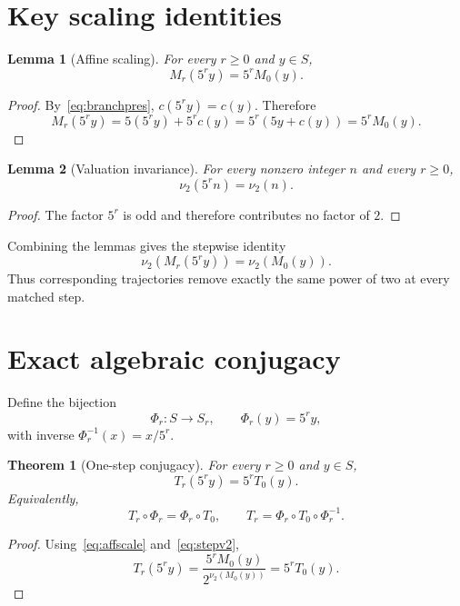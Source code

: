 \documentclass[11pt]{article}
\newtheorem{theorem}{Theorem}
\newtheorem{lemma}{Lemma}
\newcommand{\vTwo}{\nu_2}
\begin{document}
\section{Key scaling identities}
\begin{lemma}[Affine scaling]
For every $r\ge0$ and $y\in S$,
\begin{equation}
M_r(5^r y)=5^rM_0(y).
\label{eq:affscale}
\end{equation}
\end{lemma}
\begin{proof}
By~\eqref{eq:branchpres}, $c(5^r y)=c(y)$. Therefore
\[
M_r(5^r y)=5(5^r y)+5^r c(y)=5^r(5y+c(y))=5^rM_0(y).
\]
\end{proof}

\begin{lemma}[Valuation invariance]
For every nonzero integer $n$ and every $r\ge0$,
\begin{equation}
\vTwo(5^r n)=\vTwo(n).
\label{eq:v2inv}
\end{equation}
\end{lemma}
\begin{proof}
The factor $5^r$ is odd and therefore contributes no factor of $2$.
\end{proof}

Combining the lemmas gives the stepwise identity
\begin{equation}
\vTwo(M_r(5^r y))=\vTwo(M_0(y)).
\label{eq:stepv2}
\end{equation}
Thus corresponding trajectories remove exactly the same power of two at every matched step.

\section{Exact algebraic conjugacy}
Define the bijection
\[
\Phi_r:S\to S_r,\qquad \Phi_r(y)=5^r y,
\]
with inverse $\Phi_r^{-1}(x)=x/5^r$.

\begin{theorem}[One-step conjugacy]
For every $r\ge0$ and $y\in S$,
\begin{equation}
T_r(5^r y)=5^rT_0(y).
\label{eq:conj1}
\end{equation}
Equivalently,
\[
T_r\circ\Phi_r=\Phi_r\circ T_0,
\qquad
T_r=\Phi_r\circ T_0\circ\Phi_r^{-1}.
\]
\end{theorem}
\begin{proof}
Using~\eqref{eq:affscale} and~\eqref{eq:stepv2},
\[
T_r(5^r y)
=\frac{5^rM_0(y)}{2^{\vTwo(M_0(y))}}
=5^rT_0(y).
\]
\end{proof}
\end{document}
